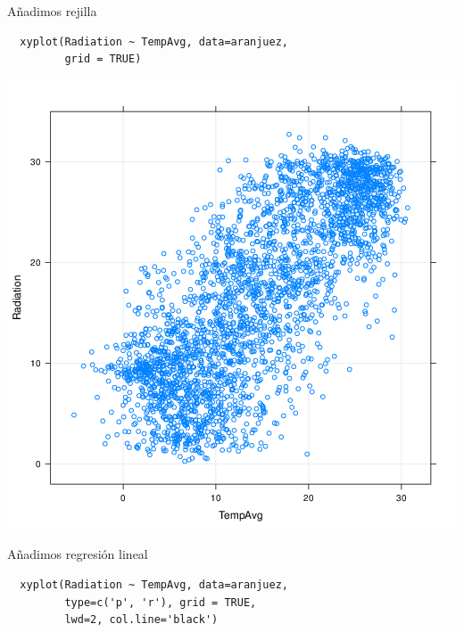 \documentclass[xcolor={usenames,svgnames,dvipsnames}]{beamer}
\begin{document}
\begin{frame}[fragile,label={sec:orgheadline11}]{Añadimos rejilla}
 \lstset{language=R,label= ,caption= ,captionpos=b,numbers=none}
\begin{lstlisting}
  xyplot(Radiation ~ TempAvg, data=aranjuez,
         grid = TRUE)
\end{lstlisting}
\end{frame}

\begin{frame}[label={sec:orgheadline12}]{}
\includegraphics[width=.9\linewidth]{figs/xyplotPG.png}
\end{frame}


\begin{frame}[fragile,label={sec:orgheadline13}]{Añadimos regresión lineal}
 \lstset{language=R,label= ,caption= ,captionpos=b,numbers=none}
\begin{lstlisting}
  xyplot(Radiation ~ TempAvg, data=aranjuez,
         type=c('p', 'r'), grid = TRUE,
         lwd=2, col.line='black')
\end{lstlisting}
\end{frame}
\end{document}
